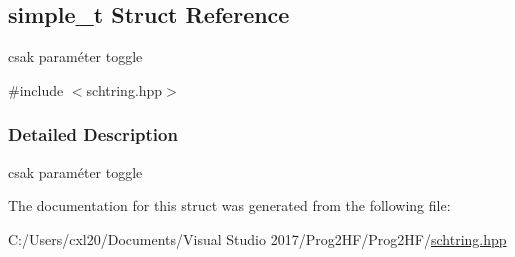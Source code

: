 \hypertarget{structsimple__t}{}\subsection{simple\+\_\+t Struct Reference}
\label{structsimple__t}


csak paraméter toggle  




{\ttfamily \#include $<$schtring.\+hpp$>$}



\subsubsection{Detailed Description}
csak paraméter toggle 

The documentation for this struct was generated from the following file\+:\begin{DoxyCompactItemize}
\item 
C\+:/\+Users/cxl20/\+Documents/\+Visual Studio 2017/\+Prog2\+H\+F/\+Prog2\+H\+F/\mbox{\hyperlink{schtring_8hpp}{schtring.\+hpp}}\end{DoxyCompactItemize}
